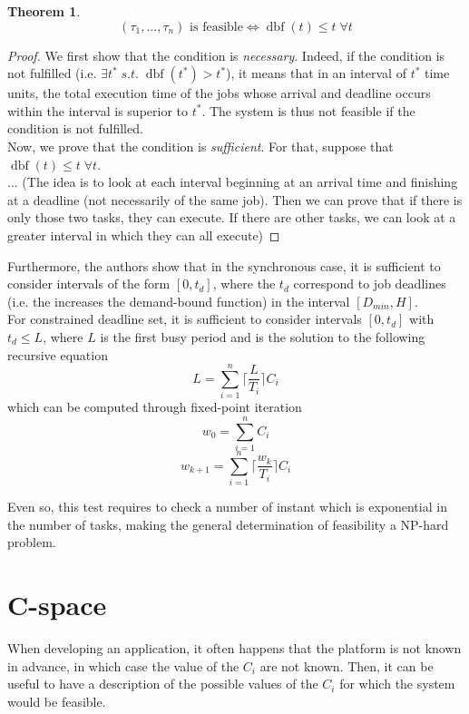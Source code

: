 \documentclass[a4paper,10pt]{article}
\newcommand{\dbf}[1]{\operatorname{dbf}(#1)}
\newtheorem{theorem}{Theorem}
\begin{document}
\begin{theorem}
$$\text{$(\tau_1, ..., \tau_n)$ is feasible} \iff \dbf{t} \leq t \; \forall t$$
\end{theorem}

\begin{proof}
	We first show that the condition is \emph{necessary}. Indeed, if the condition is not fulfilled (i.e. $\exists t^* \; s.t. \; \dbf{t^*} > t^*$), it means that in an interval of $t^*$ time units, the total execution time of the jobs whose arrival and deadline occurs within the interval is superior to $t^*$. The system is thus not feasible if the condition is not fulfilled.\\

	Now, we prove that the condition is \emph{sufficient}. For that, suppose that $\dbf{t} \leq t \; \forall t$.\\

	... (The idea is to look at each interval beginning at an arrival time and finishing at a deadline (not necessarily of the same job). Then we can prove that if there is only those two tasks, they can execute. If there are other tasks, we can look at a greater interval in which they can all execute)

\end{proof}

Furthermore, the authors show that in the synchronous case, it is sufficient to consider intervals of the form $[0, t_d]$, where the $t_d$ correspond to job deadlines (i.e. the increases the demand-bound function) in the interval $\left[ D_{min}, H \right]$.\\

For constrained deadline set, it is sufficient to consider intervals $[0, t_d]$ with $t_d \leq L$, where $L$ is the first busy period and is the solution to the following recursive equation $$L = \sum_{i=1}^{n} \lceil \frac{L}{T_i} \rceil C_i$$ which can be computed through fixed-point iteration $$w_0 = \sum_{i=1}^{n} C_i$$ $$w_{k+1} = \sum_{i=1}^{n} \lceil \frac{w_k}{T_i} \rceil C_i$$

Even so, this test requires to check a number of instant which is exponential in the number of tasks, making the general determination of feasibility a NP-hard problem.

\section{C-space}
When developing an application, it often happens that the platform is not known in advance, in which case the value of the $C_i$ are not known. Then, it can be useful to have a description of the possible values of the $C_i$ for which the system would be feasible.
\end{document}
